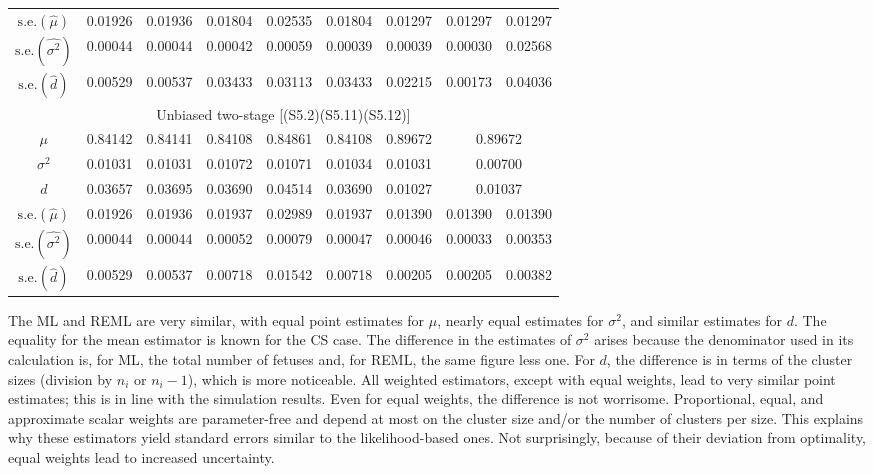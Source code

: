\documentclass[11pt,a5paper,twoside]{book}
\begin{document}
\begin{table}[!t]
\begin{center}
{\begin{tabular}{ccccccccc}
\hline
$\mbox{s.e.}(\widehat{\mu})$ & 0.01926 & 0.01936 & 0.01804 & 0.02535 & 0.01804 & 0.01297 & 0.01297 & 0.01297 \\
$\mbox{s.e.}(\widehat{\sigma^2})$ & 0.00044 & 0.00044 & 0.00042 & 0.00059 & 0.00039 & 0.00039 & 0.00030 & 0.02568 \\
  $\mbox{s.e.}(\widehat{d})$ & 0.00529 & 0.00537 & 0.03433 & 0.03113 & 0.03433 & 0.02215 & 0.00173 & 0.04036 \\
\hline\hline
\multicolumn{9}{c}{{Unbiased two-stage [(S5.2)(S5.11)(S5.12)]}}\\
\hline
$\mu$ & 0.84142 & 0.84141 & 0.84108 & 0.84861 & 0.84108 & 0.89672 & \multicolumn{2}{c}{0.89672}  \\
  $\sigma^2$ & 0.01031 & 0.01031 & 0.01072 & 0.01071 & 0.01034 & 0.01031 & \multicolumn{2}{c}{0.00700}  \\
$d$  & 0.03657 & 0.03695 & 0.03690 & 0.04514 & 0.03690 & 0.01027 & \multicolumn{2}{c}{0.01037}  \\

\hline
$\mbox{s.e.}(\widehat{\mu})$ & 0.01926 & 0.01936 & 0.01937 & 0.02989 & 0.01937 & 0.01390 & 0.01390 & 0.01390 \\
$\mbox{s.e.}(\widehat{\sigma^2})$ & 0.00044 & 0.00044 & 0.00052 & 0.00079 & 0.00047 & 0.00046 & 0.00033 & 0.00353 \\
  $\mbox{s.e.}(\widehat{d})$ & 0.00529 & 0.00537 & 0.00718 & 0.01542 & 0.00718 & 0.00205 & 0.00205 & 0.00382 \\

\hline\hline
\end{tabular}}
\end{center}
\end{table}


The ML and REML are very similar, with equal point estimates for $\mu$, 
nearly equal estimates for $\sigma^2$, and similar estimates for $d$. 
The equality for the mean estimator is known for the CS case. 
The difference in the estimates of $\sigma^2$ arises because 
the denominator used in its calculation is, for ML, the total number of 
fetuses and, for REML, the same figure less one.
For $d$, the difference is in terms of the cluster sizes 
(division by $n_i$ or $n_i-1$), which is more noticeable. 
All weighted estimators, except with equal weights, 
lead to very similar point estimates; this is in line with the 
simulation results. Even for equal weights, the difference 
is not worrisome. Proportional, equal, and approximate scalar 
weights are parameter-free and depend at most on the cluster 
size and/or the number of clusters per size. This explains 
why these estimators yield standard errors similar to the 
likelihood-based ones. Not surprisingly, because of their 
deviation from optimality, equal weights lead to increased 
uncertainty.
\end{document}
